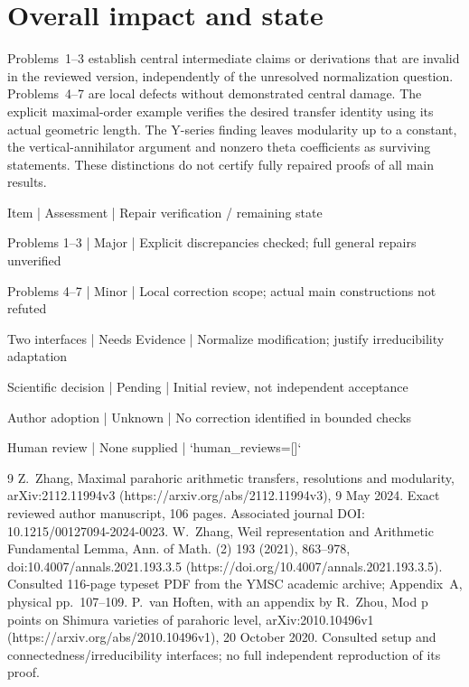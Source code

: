 \documentclass[10pt]{article}
\begin{document}
\section*{Overall impact and state}
Problems 1–3 establish central intermediate claims or derivations that are invalid in the reviewed version, independently of the unresolved normalization question. Problems 4–7 are local defects without demonstrated central damage. The explicit maximal-order example verifies the desired transfer identity using its actual geometric length. The Y-series finding leaves modularity up to a constant, the vertical-annihilator argument and nonzero theta coefficients as surviving statements. These distinctions do not certify fully repaired proofs of all main results.\par
Item | Assessment | Repair verification / remaining state\par
Problems 1–3 | Major | Explicit discrepancies checked; full general repairs unverified\par
Problems 4–7 | Minor | Local correction scope; actual main constructions not refuted\par
Two interfaces | Needs Evidence | Normalize modification; justify irreducibility adaptation\par
Scientific decision | Pending | Initial review, not independent acceptance\par
Author adoption | Unknown | No correction identified in bounded checks\par
Human review | None supplied | `human\_reviews=[]`\par
9 Z. Zhang, Maximal parahoric arithmetic transfers, resolutions and modularity, arXiv:2112.11994v3 (https://arxiv.org/abs/2112.11994v3), 9 May 2024. Exact reviewed author manuscript, 106 pages. Associated journal DOI: 10.1215/00127094-2024-0023. W. Zhang, Weil representation and Arithmetic Fundamental Lemma, Ann. of Math. (2) 193 (2021), 863–978, doi:10.4007/annals.2021.193.3.5 (https://doi.org/10.4007/annals.2021.193.3.5). Consulted 116-page typeset PDF from the YMSC academic archive; Appendix A, physical pp. 107–109. P. van Hoften, with an appendix by R. Zhou, Mod p points on Shimura varieties of parahoric level, arXiv:2010.10496v1 (https://arxiv.org/abs/2010.10496v1), 20 October 2020. Consulted setup and connectedness/irreducibility interfaces; no full independent reproduction of its proof.\par
\end{document}
